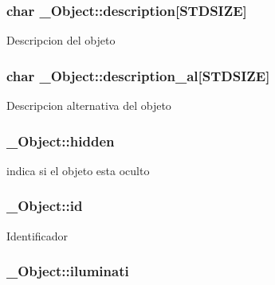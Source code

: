 \subsubsection[{\texorpdfstring{description}{description}}]{\setlength{\rightskip}{0pt plus 5cm}char \+\_\+\+Object\+::description\mbox{[}{\bf S\+T\+D\+S\+I\+ZE}\mbox{]}}\hypertarget{struct__Object_a4797c28bbea5a64792ec85433ee7215e}{}\label{struct__Object_a4797c28bbea5a64792ec85433ee7215e}
Descripcion del objeto 
\subsubsection[{\texorpdfstring{description\+\_\+al}{description_al}}]{\setlength{\rightskip}{0pt plus 5cm}char \+\_\+\+Object\+::description\+\_\+al\mbox{[}{\bf S\+T\+D\+S\+I\+ZE}\mbox{]}}\hypertarget{struct__Object_ac438e34e4ae95415af05464dd0db29b8}{}\label{struct__Object_ac438e34e4ae95415af05464dd0db29b8}
Descripcion alternativa del objeto 
\subsubsection[{\texorpdfstring{hidden}{hidden}}]{ \+\_\+\+Object\+::hidden}\hypertarget{struct__Object_a44824966fc9f4d5f82c189b2e063ddc4}{}\label{struct__Object_a44824966fc9f4d5f82c189b2e063ddc4}
indica si el objeto esta oculto 
\subsubsection[{\texorpdfstring{id}{id}}]{ \+\_\+\+Object\+::id}\hypertarget{struct__Object_a3cff7a0e8dc4e9d23895ed9af1b7653a}{}\label{struct__Object_a3cff7a0e8dc4e9d23895ed9af1b7653a}
Identificador 
\subsubsection[{\texorpdfstring{iluminati}{iluminati}}]{ \+\_\+\+Object\+::iluminati}\hypertarget{struct__Object_aac8af0a2662396bd255273a3cc8f22d7}{}\label{struct__Object_aac8af0a2662396bd255273a3cc8f22d7}
